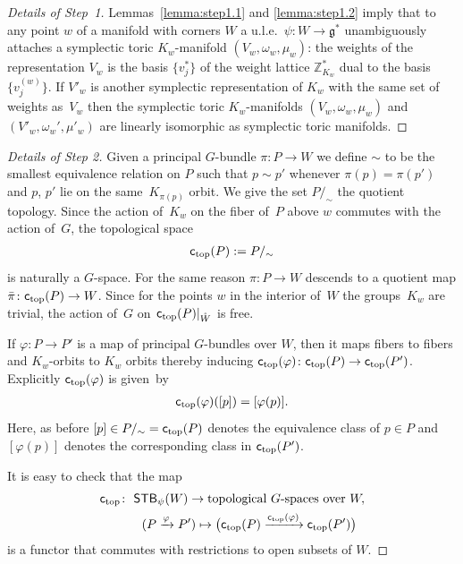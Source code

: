 \documentclass[10pt,a4paper]{amsart}
\numberwithin{equation}{section}
\begin{document}
\begin{proof}[Details of Step~1]
Lemmas~\ref{lemma:step1.1} and \ref{lemma:step1.2} imply that to any
point $w$ of a manifold with corners $W$ a u.l.e.\ $\psi\colon W\to {\mathfrak g}^*$
unambiguously attaches a symplectic toric $K_w$-manifold $(V_w,
\omega_w, \mu_w)$: the weights of the representation $V_w$ is the
basis $\{v_j^*\}$ of the weight lattice ${\mathbb Z}_{K_w}^*$ dual to the basis
$\{ v_j^{(w)}\}$.  If $V'_w$ is another symplectic representation of
$K_w$ with the same set of weights as~$V_w$ then the symplectic toric
$K_w$-manifolds $(V_w, \omega_w, \mu_w)$ and $(V'_w, \omega_w',
\mu'_w)$ are linearly isomorphic as symplectic toric manifolds.
\end{proof}


\begin{proof}[Details of Step 2]\sloppy
  Given a principal $G$-bundle $\pi\colon P\to W$ we def\/ine $\sim$ to be the
  smallest equivalence relation on $P$ such that $p\sim p'$ whenever
  $\pi(p) = \pi(p')$ and $p$, $p'$ lie on the same~$K_{\pi(p)}$ orbit.
We give the set $P/_{\sim}$ the quotient topology.  Since the
  action of~$K_w$ on the f\/iber of~$P$ above $w$ commutes with the
  action of~$G$, the topological space
\begin{gather*}
{\textsf{c}_{\rm top}}(P) := P/_{\sim}
\end{gather*}
is naturally a $G$-space.  For
  the same reason $\pi\colon P\to W$ descends to a quotient map
  \mbox{$\bar{\pi}\colon {\textsf{c}_{\rm top}}(P) \to  W$}.  Since for the points $w$ in the interior
  of~$W$ the groups~$K_w$ are trivial, the action of~$G$ on~${\textsf{c}_{\rm top}}
  (P)|_{\mathaccent23{W}}$ is free.


  If $\varphi\colon P\to P'$ is a map of principal $G$-bundles over $W$,
  then it maps f\/ibers to f\/ibers and $K_w$-orbits to $K_w$ orbits
  thereby inducing ${\textsf{c}_{\rm top}}(\varphi)\colon {\textsf{c}_{\rm top}}(P)\to {\textsf{c}_{\rm top}}(P')$.
Explicitly ${\textsf{c}_{\rm top}}(\varphi)$ is given~by
\begin{gather*}%
{\textsf{c}_{\rm top}}(\varphi)([p]) = [\varphi(p)].
\end{gather*}
Here, as before $[p]\in P/_{\sim} = {\textsf{c}_{\rm top}}(P)$ denotes the equivalence
class of $p\in P$ and $ [\varphi(p)]$ denotes the corresponding class
in ${\textsf{c}_{\rm top}}(P')$.

It is easy to check that the map
\begin{gather*}
{\textsf{c}_{\rm top}}\colon \  {\textsf{STB}}_\psi(W) \to \textrm{topological $G$-spaces over }W,\\
\hphantom{{\textsf{c}_{\rm top}}\colon} \
(P\xrightarrow{\varphi}P')\mapsto
\big({\textsf{c}_{\rm top}}(P)\xrightarrow{{\textsf{c}_{\rm top}}(\varphi)}{\textsf{c}_{\rm top}}(P')\big)
\end{gather*}
is a functor that commutes with restrictions to open subsets of $W$.
\end{proof}
\end{document}
